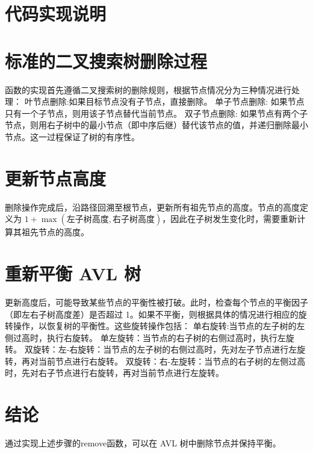 \documentclass[UTF8]{ctexart}
\begin{document}
\pagestyle{fancy}
\fancyhead{}

\section{代码实现说明}
\section{标准的二叉搜索树删除过程}
函数的实现首先遵循二叉搜索树的删除规则，根据节点情况分为三种情况进行处理：
   叶节点删除:如果目标节点没有子节点，直接删除。
   单子节点删除: 如果节点只有一个子节点，则用该子节点替代当前节点。
   双子节点删除: 如果节点有两个子节点，则用右子树中的最小节点（即中序后继）替代该节点的值，并递归删除最小节点。这一过程保证了树的有序性。

\section{更新节点高度}
删除操作完成后，沿路径回溯至根节点，更新所有祖先节点的高度。节点的高度定义为 $1 + \max(\text{左子树高度}, \text{右子树高度})$，因此在子树发生变化时，需要重新计算其祖先节点的高度。
\section{重新平衡 AVL 树}
更新高度后，可能导致某些节点的平衡性被打破。此时，检查每个节点的平衡因子（即左右子树高度差）是否超过 1。如果不平衡，则根据具体的情况进行相应的旋转操作，以恢复树的平衡性。这些旋转操作包括：
    单右旋转:当节点的左子树的左侧过高时，执行右旋转。
    单左旋转：当节点的右子树的右侧过高时，执行左旋转。
    双旋转：左-右旋转：当节点的左子树的右侧过高时，先对左子节点进行左旋转，再对当前节点进行右旋转。
    双旋转：右-左旋转：当节点的右子树的左侧过高时，先对右子节点进行右旋转，再对当前节点进行左旋转。

\section{结论}

通过实现上述步骤的remove函数，可以在 AVL 树中删除节点并保持平衡。
\end{document}
